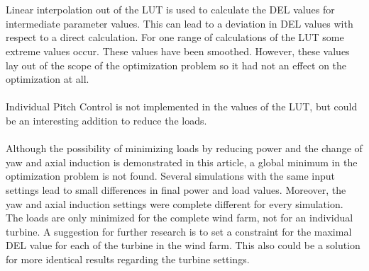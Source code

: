 \\ 
\\
Linear interpolation out of the LUT is used to calculate the DEL values for intermediate parameter values. This can lead to a deviation in DEL values with respect to a direct calculation. 
For one range of calculations of the LUT some extreme values occur. These values have been smoothed. However, these values lay out of the scope of the optimization problem so it had not an effect on the optimization at all.   
\\
\\
Individual Pitch Control is not implemented in the values of the LUT, but could be an interesting addition to reduce the loads.\cite{Wilson2017}  
\\
\\
Although the possibility of minimizing loads by reducing power and the change of yaw and axial induction is demonstrated in this article, a global minimum in the optimization problem is not found. Several simulations with the same input settings lead to small differences in final power and load values. Moreover, the yaw and axial induction settings were complete different for every simulation. \newline
The loads are only minimized for the complete wind farm, not for an individual turbine. 
A suggestion for further research is to set a constraint for the maximal DEL value for each of the turbine in the wind farm. This also could be a solution for more identical results regarding the turbine settings.

  
  
	   

